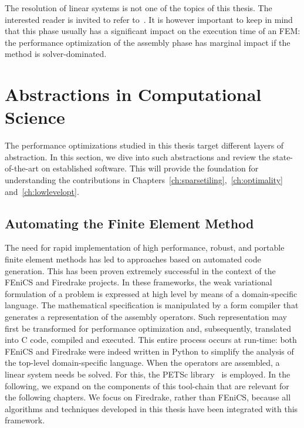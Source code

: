 The resolution of linear systems is not one of the topics of this thesis. The interested reader is invited to refer to~\cite{good-linear-system-source}. It is however important to keep in mind that this phase usually has a significant impact on the execution time of an FEM: the performance optimization of the assembly phase has marginal impact if the method is solver-dominated. 




\section{Abstractions in Computational Science}
\label{sec:bkg:abstractions}

The performance optimizations studied in this thesis target different layers of abstraction. In this section, we dive into such abstractions and review the state-of-the-art on established software. This will provide the foundation for understanding the contributions in Chapters~\ref{ch:sparsetiling},~\ref{ch:optimality} and~\ref{ch:lowlevelopt}.



\subsection{Automating the Finite Element Method}
\label{sec:bkg:fenics-and-firedrake}

The need for rapid implementation of high performance, robust, and portable finite element methods has led to approaches based on automated code generation. This has been proven extremely successful in the context of the FEniCS \citep{Fenics} and Firedrake \citep{firedrake-paper} projects. In these frameworks, the weak variational formulation of a problem is expressed at high level by means of a domain-specific language. The mathematical specification is manipulated by a form compiler that generates a representation of the assembly operators. Such representation may first be transformed for performance optimization and, subsequently, translated into C code, compiled and executed. This entire process occurs at run-time: both FEniCS and Firedrake were indeed written in Python to simplify the analysis of the top-level domain-specific language. When the operators are assembled, a linear system needs be solved. For this, the PETSc library~\citep{petsc-cite} is employed. In the following, we expand on the components of this tool-chain that are relevant for the following chapters. We focus on Firedrake, rather than FEniCS, because all algorithms and techniques developed in this thesis have been integrated with this framework.

